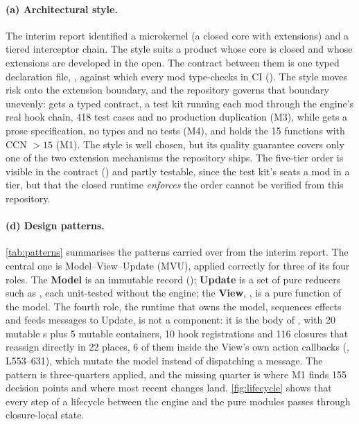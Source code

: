 \paragraph{(a) Architectural style.}
The interim report identified a microkernel (a closed core with extensions) and a tiered interceptor chain. The style suits a
product whose core is closed and whose extensions are developed in the open. The contract between them is one typed
declaration file, , against which every mod type-checks in CI
(). The style moves risk onto the extension boundary, and the repository
governs that boundary unevenly:  gets a typed contract, a test kit running each mod through the engine's real
hook chain, 418 test cases and no production duplication (M3), while  gets a prose specification, no types and
no tests (M4), and holds the 15 functions with CCN $>15$ (M1). The style is well chosen, but its quality guarantee covers
only one of the two extension mechanisms the repository ships. The five-tier order is visible in the contract
() and partly testable, since the test kit's 
seats a mod in a tier, but that the closed runtime \emph{enforces} the order cannot be verified from this repository.


\paragraph{(d) Design patterns.}
\cref{tab:patterns} summarises the patterns carried over from the interim report. The central one is Model--View--Update (MVU),
applied correctly for three of its four roles. The \textbf{Model} is an immutable record
(); \textbf{Update} is a set of pure reducers such as
, each unit-tested without the engine; the \textbf{View}, , is a pure function of the model.
The fourth role, the runtime that owns the model, sequences effects and feeds messages to Update, is not a component: it
is the body of , with 20 mutable s plus 5 mutable containers, 10 hook registrations and 116
closures that reassign  directly in 22 places, 6 of them inside the View's own action callbacks
(, L553--631), which mutate the model instead of dispatching a message. The pattern is three-quarters
applied, and the missing quarter is where M1 finds 155 decision points and where most recent changes land.
\cref{fig:lifecycle} shows that every step of a  lifecycle between the engine and the pure modules passes
through closure-local state.

